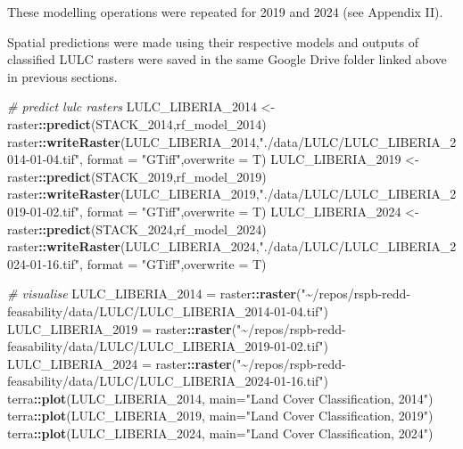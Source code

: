 \documentclass[
]{article}
\newenvironment{Shaded}{\begin{snugshade}}{\end{snugshade}}
\newcommand{\AttributeTok}[1]{\textcolor[rgb]{0.13,0.29,0.53}{#1}}
\newcommand{\CommentTok}[1]{\textcolor[rgb]{0.56,0.35,0.01}{\textit{#1}}}
\newcommand{\FunctionTok}[1]{\textcolor[rgb]{0.13,0.29,0.53}{\textbf{#1}}}
\newcommand{\NormalTok}[1]{#1}
\newcommand{\OtherTok}[1]{\textcolor[rgb]{0.56,0.35,0.01}{#1}}
\newcommand{\SpecialCharTok}[1]{\textcolor[rgb]{0.81,0.36,0.00}{\textbf{#1}}}
\newcommand{\StringTok}[1]{\textcolor[rgb]{0.31,0.60,0.02}{#1}}
\begin{document}
These modelling operations were repeated for 2019 and 2024 (see Appendix
II).

Spatial predictions were made using their respective models and outputs
of classified LULC rasters were saved in the same Google Drive folder
linked above in previous sections.

\begin{Shaded}
\begin{Highlighting}[]
\CommentTok{\# predict lulc rasters}
\NormalTok{LULC\_LIBERIA\_2014 }\OtherTok{\textless{}{-}}\NormalTok{ raster}\SpecialCharTok{::}\FunctionTok{predict}\NormalTok{(STACK\_2014,rf\_model\_2014) }
\NormalTok{raster}\SpecialCharTok{::}\FunctionTok{writeRaster}\NormalTok{(LULC\_LIBERIA\_2014,}\StringTok{"./data/LULC/LULC\_LIBERIA\_2014{-}01{-}04.tif"}\NormalTok{,}
  \AttributeTok{format =} \StringTok{"GTiff"}\NormalTok{,}\AttributeTok{overwrite =}\NormalTok{ T)}
\NormalTok{LULC\_LIBERIA\_2019 }\OtherTok{\textless{}{-}}\NormalTok{ raster}\SpecialCharTok{::}\FunctionTok{predict}\NormalTok{(STACK\_2019,rf\_model\_2019) }
\NormalTok{raster}\SpecialCharTok{::}\FunctionTok{writeRaster}\NormalTok{(LULC\_LIBERIA\_2019,}\StringTok{"./data/LULC/LULC\_LIBERIA\_2019{-}01{-}02.tif"}\NormalTok{,}
  \AttributeTok{format =} \StringTok{"GTiff"}\NormalTok{,}\AttributeTok{overwrite =}\NormalTok{ T)}
\NormalTok{LULC\_LIBERIA\_2024 }\OtherTok{\textless{}{-}}\NormalTok{ raster}\SpecialCharTok{::}\FunctionTok{predict}\NormalTok{(STACK\_2024,rf\_model\_2024) }
\NormalTok{raster}\SpecialCharTok{::}\FunctionTok{writeRaster}\NormalTok{(LULC\_LIBERIA\_2024,}\StringTok{"./data/LULC/LULC\_LIBERIA\_2024{-}01{-}16.tif"}\NormalTok{,}
  \AttributeTok{format =} \StringTok{"GTiff"}\NormalTok{,}\AttributeTok{overwrite =}\NormalTok{ T)}

\CommentTok{\# visualise}
\NormalTok{LULC\_LIBERIA\_2014 }\OtherTok{=}\NormalTok{ raster}\SpecialCharTok{::}\FunctionTok{raster}\NormalTok{(}\StringTok{"\textasciitilde{}/repos/rspb{-}redd{-}feasability/data/LULC/LULC\_LIBERIA\_2014{-}01{-}04.tif"}\NormalTok{)}
\NormalTok{LULC\_LIBERIA\_2019 }\OtherTok{=}\NormalTok{ raster}\SpecialCharTok{::}\FunctionTok{raster}\NormalTok{(}\StringTok{"\textasciitilde{}/repos/rspb{-}redd{-}feasability/data/LULC/LULC\_LIBERIA\_2019{-}01{-}02.tif"}\NormalTok{)}
\NormalTok{LULC\_LIBERIA\_2024 }\OtherTok{=}\NormalTok{ raster}\SpecialCharTok{::}\FunctionTok{raster}\NormalTok{(}\StringTok{"\textasciitilde{}/repos/rspb{-}redd{-}feasability/data/LULC/LULC\_LIBERIA\_2024{-}01{-}16.tif"}\NormalTok{)}
\NormalTok{terra}\SpecialCharTok{::}\FunctionTok{plot}\NormalTok{(LULC\_LIBERIA\_2014, }\AttributeTok{main=}\StringTok{"Land Cover Classification, 2014"}\NormalTok{)}
\NormalTok{terra}\SpecialCharTok{::}\FunctionTok{plot}\NormalTok{(LULC\_LIBERIA\_2019, }\AttributeTok{main=}\StringTok{"Land Cover Classification, 2019"}\NormalTok{)}
\NormalTok{terra}\SpecialCharTok{::}\FunctionTok{plot}\NormalTok{(LULC\_LIBERIA\_2024, }\AttributeTok{main=}\StringTok{"Land Cover Classification, 2024"}\NormalTok{)}
\end{Highlighting}
\end{Shaded}
\end{document}
